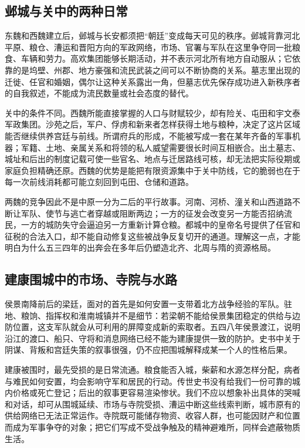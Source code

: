 \subsection{邺城与关中的两种日常}

东魏和西魏建立后，邺城与长安都须把“朝廷”变成每天可见的秩序。邺城背靠河北平原、粮仓、漕运和晋阳方向的军政网络，市场、官署与军队在这里争夺同一批粮食、车辆和劳力。高欢集团能够长期活动，并不表示河北所有地方自动服从；它依靠的是坞壁、州郡、地方豪强和流民武装之间可以不断协商的关系。墓志里出现的迁徙、任官和婚姻，偶尔让这种关系露出一角，但墓志优先保存成功进入新秩序者的自我叙述，不能成为流民数量或社会态度的替代。

关中的条件不同。西魏所能直接掌握的人口与财赋较少，却有险关、屯田和宇文泰军政集团。沙苑之后，军户、俘虏和新来者怎样获得土地与粮种，决定了这片区域能否继续供养宫廷与前线。所谓府兵的形成，不能被写成一套在某年齐备的军事机器；军籍、土地、亲属关系和将领的私人威望需要很长时间互相嵌合。出土墓志、城址和后出的制度记载可使一些官名、地点与迁居路线可核，却无法把实际役期或家庭负担精确还原。西魏的优势是能把有限资源集中于关中防线，它的脆弱也在于每一次前线消耗都可能立刻回到屯田、仓储和道路。

两魏的竞争因此不是中原一分为二后的平行故事。河南、河桥、潼关和山西道路不断让军队、使节与逃亡者穿越或阻断两边；一方的征发会改变另一方能否招纳流民，一方的城防失守会逼迫另一方重新计算仓粮。都城中的皇帝名号提供了任官和征税的合法入口，却不能自动修复这些被战争反复切开的通道。理解这一点，才能明白为什么五三四年的出奔会在多年后仍塑造北齐、北周与隋的资源格局。

\subsection{建康围城中的市场、寺院与水路}

侯景南降前后的梁廷，面对的首先是如何安置一支带着北方战争经验的军队。驻地、粮饷、指挥权和淮南城镇并不是细节：若梁朝不能给侯景集团稳定的供给与边防位置，这支军队就会从可利用的屏障变成新的索取者。五四八年侯景渡江，说明沿江的渡口、船只、守将和消息网络已经不能为建康提供一致的防护。史书中关于阴谋、背叛和宫廷失策的叙事很强，仍不应把围城解释成某一个人的性格后果。

建康被围时，最先受损的是日常流通。粮食能否入城，柴薪和水源怎样分配，病者与难民如何安置，均会影响守军和居民的行动。传世史书没有给我们一份可靠的城内价格或死亡登记；后出的叙事更容易渲染惨状。我们不应以想象补出具体的哭喊和对话，却可从围城延续、市场与寺院受损、漕运中断这些线索判断，城市原有的供给网络已无法正常运作。寺院既可能储存物资、收容人群，也可能因财产和位置而成为军事争夺的对象；把它们写成不受战争触及的精神避难所，同样会遮蔽物质生活。

